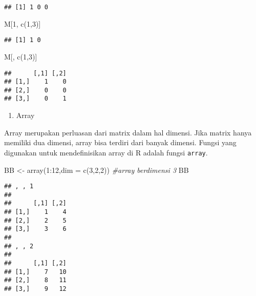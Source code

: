 \documentclass[
]{book}
\newenvironment{Shaded}{\begin{snugshade}}{\end{snugshade}}
\newcommand{\AttributeTok}[1]{\textcolor[rgb]{0.77,0.63,0.00}{#1}}
\newcommand{\CommentTok}[1]{\textcolor[rgb]{0.56,0.35,0.01}{\textit{#1}}}
\newcommand{\DecValTok}[1]{\textcolor[rgb]{0.00,0.00,0.81}{#1}}
\newcommand{\FunctionTok}[1]{\textcolor[rgb]{0.00,0.00,0.00}{#1}}
\newcommand{\NormalTok}[1]{#1}
\newcommand{\OtherTok}[1]{\textcolor[rgb]{0.56,0.35,0.01}{#1}}
\newcommand{\SpecialCharTok}[1]{\textcolor[rgb]{0.00,0.00,0.00}{#1}}
\providecommand{\tightlist}{%
  \setlength{\itemsep}{0pt}\setlength{\parskip}{0pt}}
\begin{document}
\begin{verbatim}
## [1] 1 0 0
\end{verbatim}

\begin{Shaded}
\begin{Highlighting}[]
\NormalTok{M[}\DecValTok{1}\NormalTok{, }\FunctionTok{c}\NormalTok{(}\DecValTok{1}\NormalTok{,}\DecValTok{3}\NormalTok{)]}
\end{Highlighting}
\end{Shaded}

\begin{verbatim}
## [1] 1 0
\end{verbatim}

\begin{Shaded}
\begin{Highlighting}[]
\NormalTok{M[, }\FunctionTok{c}\NormalTok{(}\DecValTok{1}\NormalTok{,}\DecValTok{3}\NormalTok{)]}
\end{Highlighting}
\end{Shaded}

\begin{verbatim}
##      [,1] [,2]
## [1,]    1    0
## [2,]    0    0
## [3,]    0    1
\end{verbatim}

\begin{enumerate}
\def\labelenumi{\arabic{enumi}.}
\setcounter{enumi}{3}
\tightlist
\item
  Array
\end{enumerate}

Array merupakan perluasan dari matrix dalam hal dimensi. Jika matrix hanya memiliki dua dimensi, array bisa terdiri dari banyak dimensi. Fungsi yang digunakan untuk mendefinisikan array di R adalah fungsi \texttt{array}.

\begin{Shaded}
\begin{Highlighting}[]
\NormalTok{BB }\OtherTok{\textless{}{-}} \FunctionTok{array}\NormalTok{(}\DecValTok{1}\SpecialCharTok{:}\DecValTok{12}\NormalTok{,}\AttributeTok{dim =} \FunctionTok{c}\NormalTok{(}\DecValTok{3}\NormalTok{,}\DecValTok{2}\NormalTok{,}\DecValTok{2}\NormalTok{)) }\CommentTok{\#array berdimensi 3}
\NormalTok{BB}
\end{Highlighting}
\end{Shaded}

\begin{verbatim}
## , , 1
## 
##      [,1] [,2]
## [1,]    1    4
## [2,]    2    5
## [3,]    3    6
## 
## , , 2
## 
##      [,1] [,2]
## [1,]    7   10
## [2,]    8   11
## [3,]    9   12
\end{verbatim}
\end{document}
